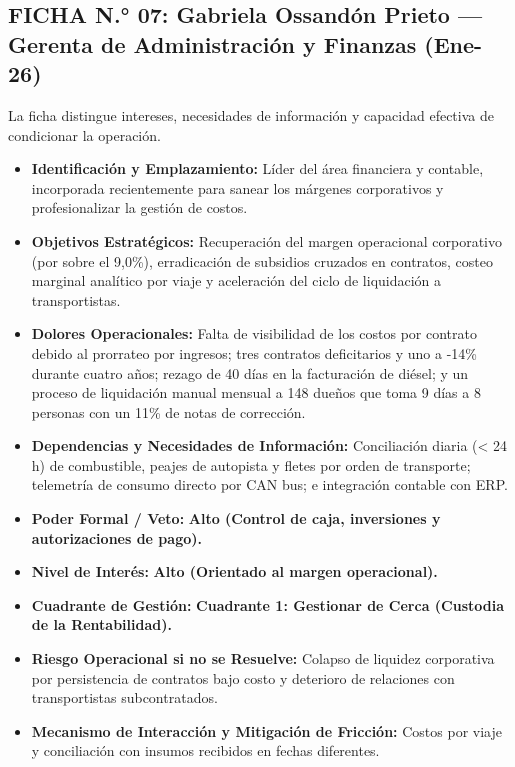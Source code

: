 \subsection*{FICHA N.° 07: Gabriela Ossandón Prieto — Gerenta de Administración y Finanzas (Ene-26)}
La ficha distingue intereses, necesidades de información y capacidad efectiva de condicionar la operación.
\begin{itemize}
\item \textbf{Identificación y Emplazamiento:} Líder del área financiera y contable, incorporada recientemente para sanear los márgenes corporativos y profesionalizar la gestión de costos.
\item \textbf{Objetivos Estratégicos:} Recuperación del margen operacional corporativo (por sobre el 9,0\%), erradicación de subsidios cruzados en contratos, costeo marginal analítico por viaje y aceleración del ciclo de liquidación a transportistas.
\item \textbf{Dolores Operacionales:} Falta de visibilidad de los costos por contrato debido al prorrateo por ingresos; tres contratos deficitarios y uno a -14\% durante cuatro años; rezago de 40 días en la facturación de diésel; y un proceso de liquidación manual mensual a 148 dueños que toma 9 días a 8 personas con un 11\% de notas de corrección.
\item \textbf{Dependencias y Necesidades de Información:} Conciliación diaria (< 24 h) de combustible, peajes de autopista y fletes por orden de transporte; telemetría de consumo directo por CAN bus; e integración contable con ERP.
\item \textbf{Poder Formal / Veto:} \textbf{Alto (Control de caja, inversiones y autorizaciones de pago).}
\item \textbf{Nivel de Interés:} \textbf{Alto (Orientado al margen operacional).}
\item \textbf{Cuadrante de Gestión:} \textbf{Cuadrante 1: Gestionar de Cerca (Custodia de la Rentabilidad).}
\item \textbf{Riesgo Operacional si no se Resuelve:} Colapso de liquidez corporativa por persistencia de contratos bajo costo y deterioro de relaciones con transportistas subcontratados.
\item \textbf{Mecanismo de Interacción y Mitigación de Fricción:} Costos por viaje y conciliación con insumos recibidos en fechas diferentes.
\end{itemize}
